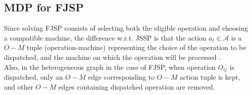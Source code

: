 \subsection{MDP for FJSP}
Since solving FJSP consists of selecting both the eligible operation and choosing a compatible machine, the difference w.r.t. JSSP is that the action $a_t \in \mathcal{A}$ is a $O-M$ tuple (operation-machine) representing the choice of the operation to be dispatched, and the machine on which the operation will be processed \cite{9826438, LEI2022117796}. \\
Also, in the heterogeneous graph in the case of FJSP, when operation $O_{ij}$ is dispatched, only an $O-M$ edge corresponding to $O-M$ action tuple is kept, and other $O-M$ edges containing dispatched operation are removed.  
